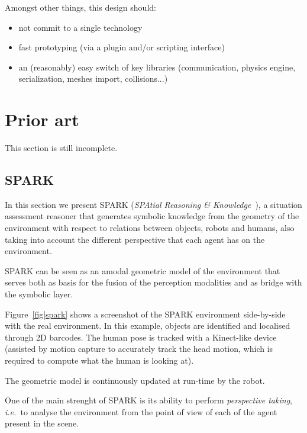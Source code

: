 \documentclass[a4paper]{article}
\newcommand{\ie}{{\textit{i.e.\ }}}
\begin{document}
Amongst other things, this design should:

\begin{itemize}
    \item not commit to a single technology

    \item fast prototyping (via a plugin and/or scripting interface)

    \item an (reasonably) easy switch of key libraries (communication, physics
        engine, serialization, meshes import, collisions...)

\end{itemize}

\section{Prior art}

This section is still incomplete.

\subsection{SPARK}

In this section we present SPARK (\emph{SPAtial
Reasoning \& Knowledge}~\cite{Sisbot2011}), a situation assessment reasoner
that generates symbolic knowledge from the geometry of the environment with
respect to relations between objects, robots and humans, also taking into
account the different perspective that each agent has on the environment.

SPARK can be seen as an amodal geometric model of the environment that serves
both as basis for the fusion of the perception modalities and as bridge with
the symbolic layer.

Figure~\ref{fig|spark} shows a screenshot of the SPARK environment side-by-side
with the real environment. In this example, objects are
identified and localised through 2D barcodes. The human pose is tracked with
a Kinect-like device (assisted by motion capture to accurately track the
head motion, which is required to compute what the human is looking at).

The geometric model is continuously updated at run-time by the robot.

One of the main strenght of SPARK is its ability to perform \emph{perspective
taking}, \ie to analyse the environment from the point of view of each of the
agent present in the scene.
\end{document}
